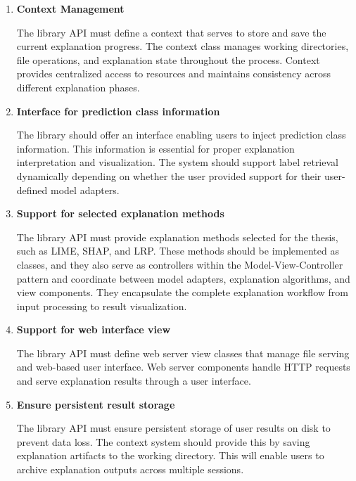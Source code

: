 \documentclass[
    bindingoffset=5mm,  %
    footnoteindent=3mm, %
    hyphenation=true    %
]{src/wut-thesis}
\begin{document}
\begin{enumerate}[itemsep=1\baselineskip]
    \item \textbf{Context Management}

        The library API must define a context that serves to store and save the current explanation progress.
    The context class manages working directories, file operations, and explanation state throughout the process.
    Context provides centralized access to resources and maintains consistency across different explanation phases.

    \item \textbf{Interface for prediction class information}

        The library should offer an interface enabling users to inject prediction class information.
    This information is essential for proper explanation interpretation and visualization.
    The system should support label retrieval dynamically depending on whether the user provided
    support for their user-defined model adapters.

    \item \textbf{Support for selected explanation methods}

        The library API must provide explanation methods selected for the thesis, such as LIME, SHAP, and LRP.
    These methods should be implemented as classes, and they also serve as controllers within
    the Model-View-Controller pattern and coordinate between model adapters, explanation algorithms, and view components. They encapsulate the complete explanation workflow from input processing to result visualization.

    \item \textbf{Support for web interface view}

        The library API must define web server view classes that manage file serving and web-based user interface.
    Web server components handle HTTP requests and serve explanation results through a user interface.

    \item \textbf{Ensure persistent result storage}

        The library API must ensure persistent storage of user results on disk to prevent
    data loss. The context system should provide this by saving explanation artifacts to
    the working directory. This will enable users to archive explanation outputs across 
    multiple sessions.
    
    \end{enumerate}
\end{document}
